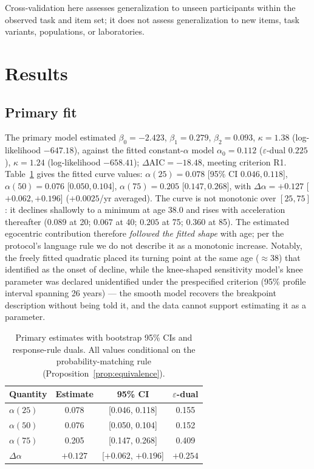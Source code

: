 \documentclass[11pt]{article}
\newcommand{\dalpha}{\ensuremath{\Delta\alpha}}
\begin{document}
Cross-validation here assesses generalization to unseen participants within the
observed task and item set; it does not assess generalization to new items,
task variants, populations, or laboratories.

\section{Results}\label{sec:results}

\subsection{Primary fit}\label{sec:fit}

The primary model estimated $\beta_0 = -2.423$, $\beta_1 = 0.279$,
$\beta_2 = 0.093$, $\kappa = 1.38$ (log-likelihood $-647.18$), against the
fitted constant-$\alpha$ model $\alpha_0 = 0.112$ ($\varepsilon$-dual $0.225$),
$\kappa = 1.24$ (log-likelihood $-658.41$); $\Delta\mathrm{AIC} = -18.48$,
meeting criterion R1. Table~\ref{tab:main} gives the fitted curve values:
$\alpha(25) = 0.078$ [95\% CI $0.046, 0.118$], $\alpha(50) = 0.076$
[$0.050, 0.104$], $\alpha(75) = 0.205$ [$0.147, 0.268$], with
$\dalpha = +0.127$ [$+0.062, +0.196$] ($+0.0025$/yr averaged). The curve is
not monotonic over $[25, 75]$: it declines shallowly to a minimum at age 38.0
and rises with acceleration thereafter ($0.089$ at 20; $0.067$ at 40; $0.205$
at 75; $0.360$ at 85). The estimated egocentric contribution therefore
\emph{followed the fitted shape} with age; per the protocol's language rule we
do not describe it as a monotonic increase. Notably, the freely fitted
quadratic placed its turning point at the same age ($\approx$38) that
\citet{bradford2023} identified as the onset of decline, while the knee-shaped
sensitivity model's knee parameter was declared unidentified under the
prespecified criterion (95\% profile interval spanning 26 years) --- the smooth
model recovers the breakpoint description without being told it, and the data
cannot support estimating it as a parameter.

\begin{table}[tb]
  \centering
  \caption{Primary estimates with bootstrap 95\% CIs and response-rule duals.
  All values conditional on the probability-matching rule
  (Proposition~\ref{prop:equivalence}).}
  \label{tab:main}
  \begin{tabular}{lccc}
    \toprule
    Quantity & Estimate & 95\% CI & $\varepsilon$-dual \\
    \midrule
    $\alpha(25)$ & 0.078 & [0.046, 0.118] & 0.155 \\
    $\alpha(50)$ & 0.076 & [0.050, 0.104] & 0.152 \\
    $\alpha(75)$ & 0.205 & [0.147, 0.268] & 0.409 \\
    $\dalpha$    & $+0.127$ & [$+0.062$, $+0.196$] & $+0.254$ \\
    \bottomrule
  \end{tabular}
\end{table}
\end{document}
